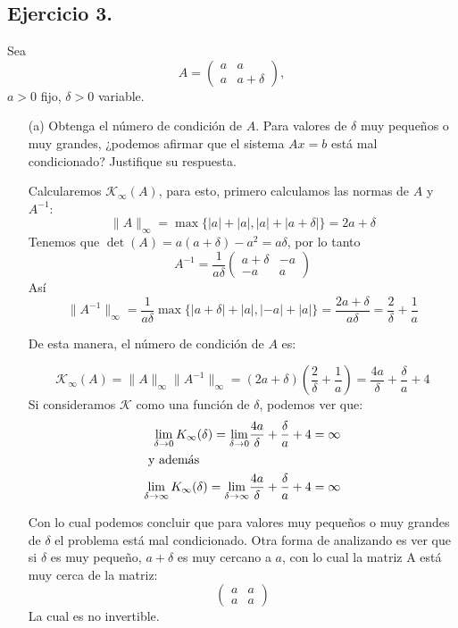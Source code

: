 
\subsection*{Ejercicio 3.}
Sea
\[
A =
\begin{pmatrix}
a & a \\
a & a + \delta
\end{pmatrix},
\]
$a > 0$ fijo, $\delta > 0$ variable.

\begin{enumerate}
    \item[(a)] Obtenga el número de condición de $A$. Para valores de $\delta$ muy pequeños o muy grandes, ¿podemos afirmar que el sistema $Ax = b$ está mal condicionado? Justifique su respuesta.\\ 

    \begin{solution}
    Calcularemos $\mathcal{K}_\infty(A)$, para esto, primero calculamos las normas de $A$ y $A^{-1}$:
    \[
    \|A\|_\infty=\max{\{|a|+|a|,|a|+|a+\delta|\}}= 2a + \delta
    \]
    Tenemos que $\det{(A)}=a(a+\delta)-a^2=a\delta$, por lo tanto
    \[
    A^{-1}=\frac{1}{a\delta}\begin{pmatrix}
        a + \delta & -a \\ 
        -a & a
    \end{pmatrix}
    \]
    Así 
    \[
    \|A^{-1}\|_{\infty}=\frac{1}{a\delta}\max{\{|a+\delta|+|a|,|-a|+|a|\}}=\frac{2a+\delta}{a\delta}=\frac{2}{\delta}+\frac{1}{a}
    \]

    De esta manera, el número de condición de $A$ es:

    \[
    \mathcal{K}_{\infty}(A)=\|A\|_\infty \|A^{-1}\|_\infty=(2a+\delta)\left(\frac{2}{\delta}+\frac{1}{a}\right)=\frac{4a}{\delta} + \frac{\delta}{a} + 4
    \]
    Si consideramos $\mathcal{K}$ como una función de $\delta$, podemos ver que:
    \begin{align*}
    \lim_{\delta\rightarrow 0} K_{\infty}(\delta)= \lim_{\delta\rightarrow 0} & \frac{4a}{\delta} + \frac{\delta}{a}+4=\infty\\
    \intertext{ y además}
    \lim_{\delta\rightarrow \infty} K_{\infty}(\delta)= \lim_{\delta\rightarrow \infty} & \frac{4a}{\delta} + \frac{\delta}{a}+4=\infty
    \end{align*}

    Con lo cual podemos concluir que para valores muy pequeños o muy grandes de $\delta$ el problema está mal condicionado. Otra forma de analizando es ver que si $\delta$ es muy pequeño, $a + \delta$ es muy cercano a $a$, con lo cual la matriz A está muy cerca de la matriz:
    \[
    \begin{pmatrix}
    a & a \\ 
    a & a
    \end{pmatrix}
    \] 
    La cual es no invertible.


\end{solution}
\end{enumerate}
